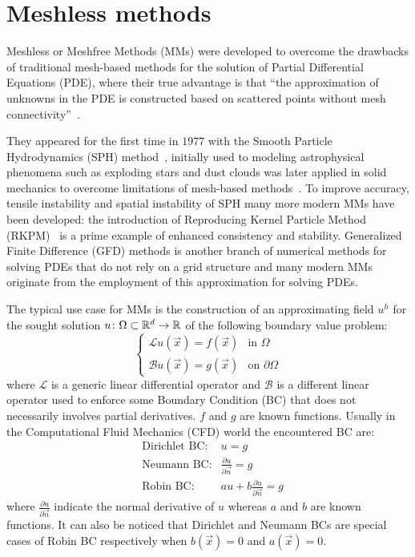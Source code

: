 \chapter{Meshless methods}
\label{chap:meshless_methods}

Meshless or Meshfree Methods (MMs) were developed to overcome the drawbacks of traditional mesh-based methods for the solution of Partial Differential Equations (PDE), where their true advantage is that ``the approximation of unknowns in the PDE is constructed based on scattered points without mesh connectivity''~\cite{Chen:meshless_overview_after_20_years}.

They appeared for the first time in $1977$ with the Smooth Particle Hydrodynamics (SPH) method~\cite{Belytschko:meshless_overview}, initially used to modeling astrophysical phenomena such as exploding stars and dust clouds was later applied in solid mechanics to overcome limitations of mesh-based methods~\cite{Benz:SPH_on_solid_mechanics}. To improve accuracy, tensile instability and spatial instability of SPH many more modern MMs have been developed: the introduction of Reproducing Kernel Particle Method (RKPM)~\cite{Liu:RKPM} is a prime example of enhanced consistency and stability.
Generalized Finite Difference (GFD) methods is another branch of numerical methods for solving PDEs that do not rely on a grid structure and many modern MMs originate from the employment of this approximation for solving PDEs.

The typical use case for MMs is the construction of an approximating field $u^{h}$ for the sought solution $u\colon\Omega\subset \mathbb{R}^{d}\to\mathbb{R}$ of the following boundary value problem:
\begin{equation}
	\label{eqn:generic_continous_PDE}
	\begin{cases}
		\mathcal{L} u(\vec{x})  = f(\vec{x})		& \text{in $\Omega$} \\
		\mathcal{B} u(\vec{x})   = g(\vec{x})	     & \text{on $\partial\Omega$}
	\end{cases}
\end{equation}
where $\mathcal{L}$ is a generic linear differential operator and $\mathcal{B}$ is a different linear operator used to enforce some Boundary Condition (BC) that does not necessarily involves partial derivatives. $f$ and $g$ are known functions.
Usually in the Computational Fluid Mechanics (CFD) world the encountered BC are:
\begin{align}
	& \text{Dirichlet BC:} & u=g  \\
	& \text{Neumann BC:} & \frac{\partial u}{\partial \vec{n}} = g  \\
	& \text{Robin BC:} & au + b\frac{\partial u}{\partial \vec{n}} = g
\end{align}
where $\frac{\partial u}{\partial \vec{n}}$ indicate the normal derivative of $u$ whereas $a$ and $b$ are known functions. It can also be noticed that Dirichlet and Neumann BCs are special cases of Robin BC respectively when $b(\vec{x})=0$ and $a(\vec{x})=0$.

